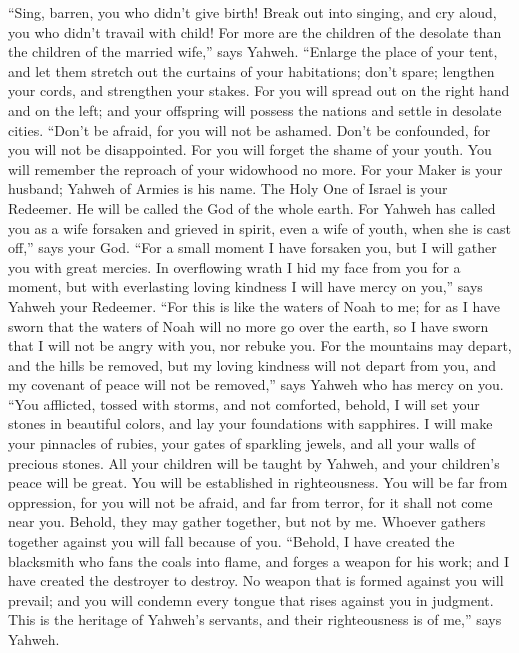  ``Sing, barren, you who didn't give birth! Break out into
singing, and cry aloud, you who didn't travail with child! For more are
the children of the desolate than the children of the married wife,''
says Yahweh.  ``Enlarge the place of your tent, and let
them stretch out the curtains of your habitations; don't spare; lengthen
your cords, and strengthen your stakes.  For you will
spread out on the right hand and on the left; and your offspring will
possess the nations and settle in desolate cities. 
``Don't be afraid, for you will not be ashamed. Don't be confounded, for
you will not be disappointed. For you will forget the shame of your
youth. You will remember the reproach of your widowhood no more.
 For your Maker is your husband; Yahweh of Armies is his
name. The Holy One of Israel is your Redeemer. He will be called the God
of the whole earth.  For Yahweh has called you as a wife
forsaken and grieved in spirit, even a wife of youth, when she is cast
off,'' says your God.  ``For a small moment I have
forsaken you, but I will gather you with great mercies. 
In overflowing wrath I hid my face from you for a moment, but with
everlasting loving kindness I will have mercy on you,'' says Yahweh your
Redeemer.  ``For this is like the waters of Noah to me;
for as I have sworn that the waters of Noah will no more go over the
earth, so I have sworn that I will not be angry with you, nor rebuke
you.  For the mountains may depart, and the hills be
removed, but my loving kindness will not depart from you, and my
covenant of peace will not be removed,'' says Yahweh who has mercy on
you.  ``You afflicted, tossed with storms, and not
comforted, behold, I will set your stones in beautiful colors, and lay
your foundations with sapphires.  I will make your
pinnacles of rubies, your gates of sparkling jewels, and all your walls
of precious stones.  All your children will be taught by
Yahweh, and your children's peace will be great.  You
will be established in righteousness. You will be far from oppression,
for you will not be afraid, and far from terror, for it shall not come
near you.  Behold, they may gather together, but not by
me. Whoever gathers together against you will fall because of you.
 ``Behold, I have created the blacksmith who fans the
coals into flame, and forges a weapon for his work; and I have created
the destroyer to destroy.  No weapon that is formed
against you will prevail; and you will condemn every tongue that rises
against you in judgment. This is the heritage of Yahweh's servants, and
their righteousness is of me,'' says Yahweh.

